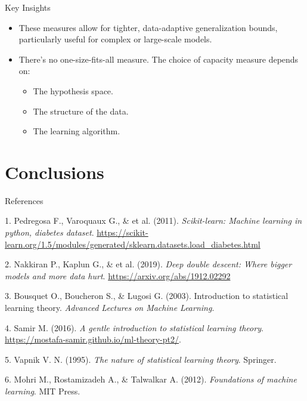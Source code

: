 \documentclass[
  ignorenonframetext,
]{beamer}
\providecommand{\tightlist}{%
  \setlength{\itemsep}{0pt}\setlength{\parskip}{0pt}}\usepackage{longtable,booktabs,array}
\newlength{\cslhangindent}
\newenvironment{CSLReferences}[2] %
 {\begin{list}{}{%
  \setlength{\itemindent}{0pt}
  \setlength{\leftmargin}{0pt}
  \setlength{\parsep}{0pt}
  \ifodd #1
   \setlength{\leftmargin}{\cslhangindent}
   \setlength{\itemindent}{-1\cslhangindent}
  \fi
  \setlength{\itemsep}{#2\baselineskip}}}
 {\end{list}}
\begin{document}
\begin{frame}
\begin{block}{Key Insights}
\label{key-insights-1}
\begin{itemize}
\tightlist
\item
  These measures allow for tighter, data-adaptive generalization bounds,
  particularly useful for complex or large-scale models.
\item
  There's no one-size-fits-all measure. The choice of capacity measure
  depends on:

  \begin{itemize}
  \tightlist
  \item
    The hypothesis space.
  \item
    The structure of the data.
  \item
    The learning algorithm.
  \end{itemize}
\end{itemize}
\end{block}
\end{frame}

\section{Conclusions}\label{conclusions}

\begin{frame}
\begin{block}{References}
\label{references}
\label{refs}
\begin{CSLReferences}{1}{0}
\footnotesize

1. Pedregosa F., Varoquaux G., \& et al. (2011). \emph{Scikit-learn:
Machine learning in python, diabetes dataset}.
\url{https://scikit-learn.org/1.5/modules/generated/sklearn.datasets.load_diabetes.html}

2. Nakkiran P., Kaplun G., \& et al. (2019). \emph{Deep double descent:
Where bigger models and more data hurt}.
\url{https://arxiv.org/abs/1912.02292}

3. Bousquet O., Boucheron S., \& Lugosi G. (2003). Introduction to
statistical learning theory. \emph{Advanced Lectures on Machine
Learning}.

4. Samir M. (2016). \emph{A gentle introduction to statistical learning
theory}. \url{https://mostafa-samir.github.io/ml-theory-pt2/}.

5. Vapnik V. N. (1995). \emph{The nature of statistical learning
theory}. Springer.

6. Mohri M., Rostamizadeh A., \& Talwalkar A. (2012). \emph{Foundations
of machine learning}. MIT Press.

\end{CSLReferences}
\end{block}
\end{frame}
\end{document}
